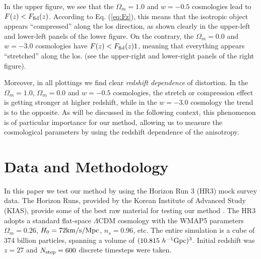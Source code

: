 \documentclass{emulateapj}
\begin{document}
In the upper figure, we see that the $\Omega_m=1.0$ and $w=-0.5$ cosmologies lead to $F(z) < F_{\rm fid}(z)$.
According to Eq. (\ref{eq:Fz}), this means that the isotropic object appears ``compressed'' along the los direction,
as shown clearly in the upper-left and lower-left panels of the lower figure.
On the contrary, the $\Omega_m=0.0$ and $w=-3.0$ cosmologies have $F(z)<F_{\rm fid}(z)1$, 
meaning that everything appears ``stretched'' along the los.
(see the upper-right and lower-right panels of the right figure).

Moreover, in all plottings we find clear {\it redshift dependence} of distortion.
In the $\Omega_m=1.0$, $\Omega_m=0.0$ and $w=-0.5$ cosmologies, the stretch or compression effect is getting stronger at higher redshift,
while in the $w=-3.0$ cosmology the trend is to the opposite.
As will be discussed in the following context, this phenomenon is of particular importance for our method,
allowing us to measure the cosmological parameters by using the redshift dependence of the anisotropy.

\section{Data and Methodology}

In this paper we test our method by using the Horizon Run 3 (HR3) mock survey data.
The Horizon Runs, provided by the Korean Institute of Advanced Study (KIAS),
provide some of the best raw material for testing our method
\citep{park 2005,horizonrun}. 
The HR3 adopts a standard flat-space $\Lambda$CDM cosmology
with the WMAP5 parameters \citep[]{spergel 2003, komatsu 2011, hinshaw 2013} 
$\Omega_{m}=0.26$, $H_{0}=72{\rm km/s/Mpc}$, $n_{s}=0.96$, etc.
The entire simulation is a cube of 374 billion particles, 
spanning a volume of $(10.815 {~ h^{-1}} {\rm{Gpc}})^3$.
Initial redshift was $z=27$ and $N_{\rm step}=600$ discrete timesteps were taken.
\end{document}
